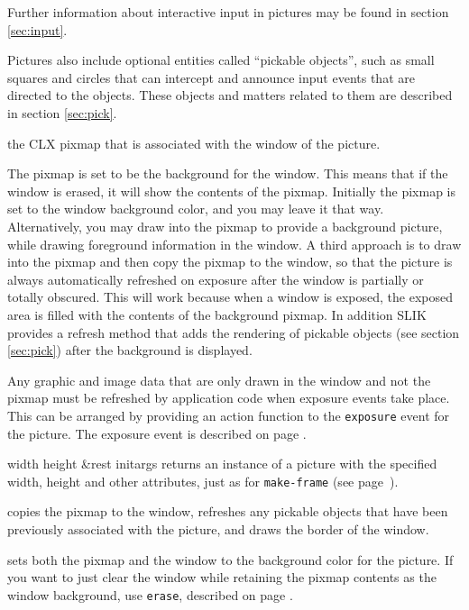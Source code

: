 \documentclass[twoside,openright,11pt]{report}
\newcommand{\tp}[1]{\texttt{#1}}
\begin{document}
Further information about interactive input in pictures may be found
in section \ref{sec:input}.

Pictures also include optional entities called ``pickable objects'',
such as small squares and circles that can intercept and announce
input events that are directed to the objects.  These objects and
matters related to them are described in section \ref{sec:pick}.


{the CLX pixmap that is associated with the window of the picture.}

The pixmap is set to be the background for the window.  This means
that if the window is erased, it will show the contents of the pixmap.
Initially the pixmap is set to the window background color, and you
may leave it that way.  Alternatively, you may draw into the pixmap to
provide a background picture, while drawing foreground information in
the window.  A third approach is to draw into the pixmap and then copy
the pixmap to the window, so that the picture is always automatically
refreshed on exposure after the window is partially or totally
obscured.  This will work because when a window is exposed, the
exposed area is filled with the contents of the background pixmap.  In
addition SLIK provides a refresh method that adds the rendering of
pickable objects (see section \ref{sec:pick}) after the background is
displayed.

Any graphic and image data that are only drawn in the window and not
the pixmap must be refreshed by application code when exposure events
take place.  This can be arranged by providing an action function to
the \tp{exposure} event for the picture.  The exposure event is
described on page \pageref{pg:frameann}.


{width height \&rest initargs}
{returns an instance of a picture with the specified width, height and
other attributes, just as for \tp{make-frame} (see
page~\pageref{pg:makeframe}).}

{copies the pixmap to the window, refreshes any pickable objects that
have been previously associated with the picture, and draws the border
of the window.}

{sets both the pixmap and the window to the background color for the
picture.  If you want to just clear the window while retaining the
pixmap contents as the window background, use \tp{erase},
described on page \pageref{pg:erase}.}
\end{document}
